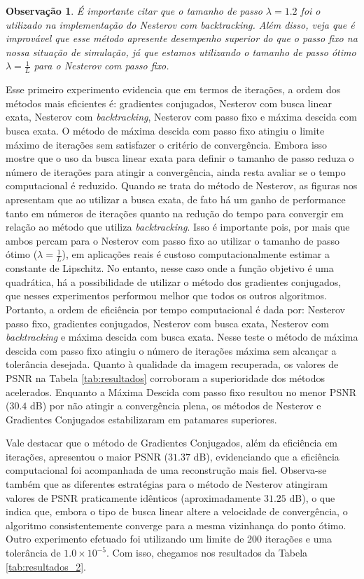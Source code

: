 \documentclass[12pt]{article}
\newtheorem{observation}{Observação}
\begin{document}
\begin{observation}
    É importante citar que o tamanho de passo $\lambda = 1.2$ foi o utilizado na implementação do Nesterov com \textit{backtracking}. Além disso, veja que é improvável que esse método apresente desempenho superior do que o passo fixo na nossa situação de simulação, já que estamos utilizando o tamanho de passo ótimo $\lambda = \frac{1}{L}$ para o Nesterov com passo fixo.
\end{observation}

Esse primeiro experimento evidencia que em termos de iterações, a ordem dos métodos mais eficientes é: gradientes conjugados, Nesterov com busca linear exata, Nesterov com \textit{backtracking}, Nesterov com passo fixo e máxima descida com busca exata. O método de máxima descida com passo fixo atingiu o limite máximo de iterações sem satisfazer o critério de convergência. Embora isso mostre que o uso da busca linear exata para definir o tamanho de passo reduza o número de iterações para atingir a convergência, ainda resta avaliar se o tempo computacional é reduzido. Quando se trata do método de Nesterov, as figuras nos apresentam que ao utilizar a busca exata, de fato há um ganho de performance tanto em números de iterações quanto na redução do tempo para convergir em relação ao método que utiliza \textit{backtracking}. Isso é importante pois, por mais que ambos percam para o Nesterov com passo fixo ao utilizar o tamanho de passo ótimo ($\lambda = \frac{1}{L}$), em aplicações reais é custoso computacionalmente estimar a constante de Lipschitz. No entanto, nesse caso onde a função objetivo é uma quadrática, há a possibilidade de utilizar o método dos gradientes conjugados, que nesses experimentos performou melhor que todos os outros algoritmos. Portanto, a ordem de eficiência por tempo computacional é dada por: Nesterov passo fixo, gradientes conjugados, Nesterov com busca exata, Nesterov com \textit{backtracking} e máxima descida com busca exata. Nesse teste o método de máxima descida com passo fixo atingiu o número de iterações máxima sem alcançar a tolerância desejada.
Quanto à qualidade da imagem recuperada, os valores de PSNR na Tabela \ref{tab:resultados} corroboram a superioridade dos métodos acelerados. Enquanto a Máxima Descida com passo fixo resultou no menor PSNR ($30.4$ dB) por não atingir a convergência plena, os métodos de Nesterov e Gradientes Conjugados estabilizaram em patamares superiores. 

Vale destacar que o método de Gradientes Conjugados, além da eficiência em iterações, apresentou o maior PSNR ($31.37$ dB), evidenciando que a eficiência computacional foi acompanhada de uma reconstrução mais fiel. Observa-se também que as diferentes estratégias para o método de Nesterov atingiram valores de PSNR praticamente idênticos (aproximadamente $31.25$ dB), o que indica que, embora o tipo de busca linear altere a velocidade de convergência, o algoritmo consistentemente converge para a mesma vizinhança do ponto ótimo.
Outro experimento efetuado foi utilizando um limite de 200 iterações e uma tolerância de $1.0 \times 10^{-5}$. Com isso, chegamos nos resultados da Tabela \ref{tab:resultados_2}.
\end{document}
